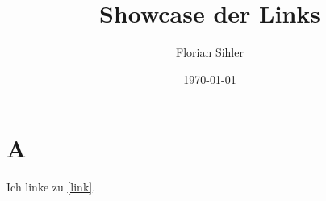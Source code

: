 \documentclass{article}
\title{Showcase der Links}
\author{Florian Sihler}
\date{\today}
\begin{document}
\maketitle
\section{A}
\label{link}

Ich linke zu \autoref{link}.
\end{document}
